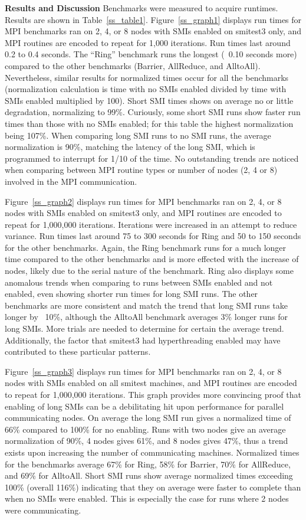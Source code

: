 \documentclass{IEEEtran}
\begin{document}
\textbf{Results and Discussion}
Benchmarks were measured to acquire runtimes. Results are shown in Table~\ref{ss_table1}. Figure~\ref{ss_graph1} displays run times for MPI benchmarks ran on 2, 4, or 8 nodes with SMIs enabled on smitest3 only, and MPI routines are encoded to repeat for 1,000 iterations. Run times last around 0.2 to 0.4 seconds. The “Ring” benchmark runs the longest (~0.10 seconds more) compared to the other benchmarks (Barrier, AllReduce, and AlltoAll). Nevertheless, similar results for normalized times occur for all the benchmarks (normalization calculation is time with no SMIs enabled divided by time with SMIs enabled multiplied by 100). Short SMI times shows on average no or little degradation, normalizing to 99\%. Curiously, some short SMI runs show faster run times than those with no SMIs enabled; for this table the highest normalization being 107\%. When comparing long SMI runs to no SMI runs, the average normalization is 90\%, matching the latency of the long SMI, which is programmed to interrupt for 1/10 of the time. No outstanding trends are noticed when comparing between MPI routine types or number of nodes (2, 4 or 8) involved in the MPI communication.

Figure~\ref{ss_graph2} displays run times for MPI benchmarks ran on 2, 4, or 8 nodes with SMIs enabled on smitest3 only, and MPI routines are encoded to repeat for 1,000,000 iterations. Iterations were increased in an attempt to reduce variance. Run times last around 75 to 300 seconds for Ring and 50 to 150 seconds for the other benchmarks. Again, the Ring benchmark runs for a much longer time compared to the other benchmarks and is more effected with the increase of nodes, likely due to the serial nature of the benchmark. Ring also displays some anomalous trends when comparing to runs between SMIs enabled and not enabled, even showing shorter run times for long SMI runs. The other benchmarks are more consistent and match the trend that long SMI runs take longer by ~10\%, although the AlltoAll benchmark averages 3\% longer runs for long SMIs. More trials are needed to determine for certain the average trend. Additionally, the factor that smitest3 had hyperthreading enabled may have contributed to these particular patterns.

Figure~\ref{ss_graph3} displays run times for MPI benchmarks ran on 2, 4, or 8 nodes with SMIs enabled on all smitest machines, and MPI routines are encoded to repeat for 1,000,000 iterations. This graph provides more convincing proof that enabling of long SMIs can be a debilitating hit upon performance for parallel communicating nodes. On average the long SMI run gives a normalized time of 66\% compared to 100\% for no enabling. Runs with two nodes give an average normalization of 90\%, 4 nodes gives 61\%, and 8 nodes gives 47\%, thus a trend exists upon increasing the number of communicating machines. Normalized times for the benchmarks average 67\% for Ring, 58\% for Barrier, 70\% for AllReduce, and 69\% for AlltoAll. Short SMI runs show average normalized times exceeding 100\% (overall 116\%) indicating that they on average were faster to complete than when no SMIs were enabled. This is especially the case for runs where 2 nodes were communicating.
\end{document}

